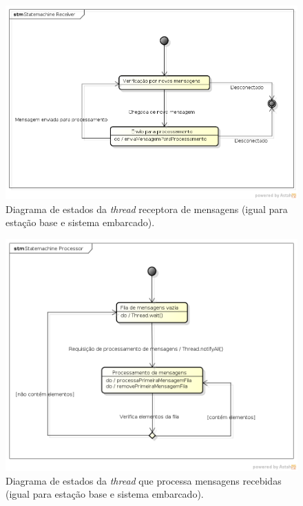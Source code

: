 \begin{figure}[H]
  \centering
  \includegraphics[width=\textwidth, keepaspectratio]{./figuras/diagrama_estados_receiver.png}
  \caption{Diagrama de estados da \textit{thread} receptora de mensagens (igual para estação base e sistema embarcado).}
  \label{fig:diagrama_estados_receiver}
\end{figure}

\begin{figure}[H]
  \centering
  \includegraphics[width=\textwidth, keepaspectratio]{./figuras/diagrama_estados_processor.png}
  \caption{Diagrama de estados da \textit{thread} que processa mensagens recebidas (igual para estação base e sistema embarcado).}
  \label{fig:diagrama_estados_processor}
\end{figure}

